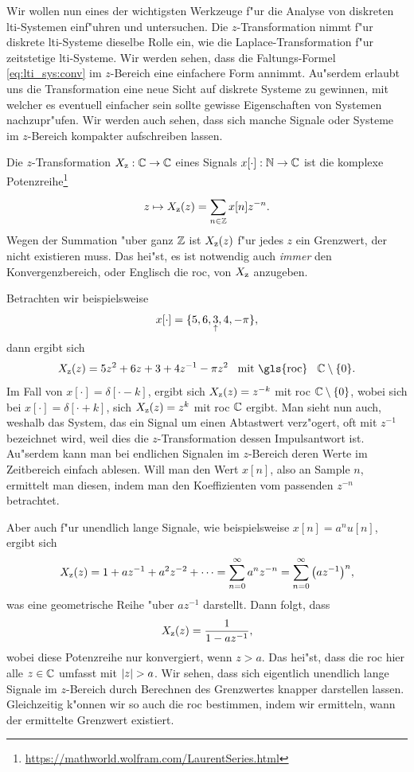 Wir wollen nun eines der wichtigsten Werkzeuge f"ur die Analyse von diskreten \gls{lti}-Systemen einf"uhren und untersuchen.
Die $z$-Transformation nimmt f"ur diskrete \gls{lti}-Systeme dieselbe Rolle ein, wie die Laplace-Transformation f"ur zeitstetige \gls{lti}-Systeme.
Wir werden sehen, dass die Faltungs-Formel \eqref{eq:lti_sys:conv} im $z$-Bereich eine einfachere Form annimmt.
Au"serdem erlaubt uns die Transformation eine neue Sicht auf diskrete Systeme zu gewinnen, mit welcher es eventuell einfacher sein sollte gewisse Eigenschaften von Systemen nachzupr"ufen.
Wir werden auch sehen, dass sich manche Signale oder Systeme im $z$-Bereich kompakter aufschreiben lassen.

Die $z$-Transformation $X_{\rm z}: \mathbb{C} \rightarrow \mathbb{C}$ eines Signals $x[\cdot] : \mathbb{N} \rightarrow \mathbb{C}$ ist die komplexe Potenzreihe\footnote{\url{https://mathworld.wolfram.com/LaurentSeries.html}}
\begin{equation}\label{eq:ztrafo:def}
    z \mapsto X_{\rm z}(z) = {\sum\limits_{n\in\mathbb{Z}}^{}{x[n] z^{-n}}}.
\end{equation}
Wegen der Summation "uber ganz $\mathbb{Z}$ ist $X_{\rm z}(z)$ f"ur jedes $z$ ein Grenzwert, der nicht existieren muss.
Das hei"st, es ist notwendig auch \emph{immer} den Konvergenzbereich, oder Englisch die \gls{roc}, von $X_{\rm z}$ anzugeben.

Betrachten wir beispielsweise \[x[\cdot] = \{5,6,\underset{\uparrow}{3},4,-\pi\},\] dann ergibt sich \[X_\z(z) = 5 z^2 + 6 z + 3 + 4z^{-1} - \pi z^2 \Text{mit \gls{roc}} \C \setminus \{0\}.\] 
Im Fall von $x[\cdot] = \delta[\cdot-k]$, ergibt sich $X_{\rm z}(z) = z^{-k}$ mit \gls{roc} $\mathbb{C} \setminus \{0\}$, wobei sich bei $x[\cdot] = \delta[\cdot+k]$, sich $X_{\rm z}(z) = z^{k}$ mit \gls{roc} $\mathbb{C}$ ergibt.
Man sieht nun auch, weshalb das System, das ein Signal um einen Abtastwert verz"ogert, oft mit $z^{-1}$ bezeichnet wird, weil dies die $z$-Transformation dessen Impulsantwort ist.
Au"serdem kann man bei endlichen Signalen im $z$-Bereich deren Werte im Zeitbereich einfach ablesen. 
Will man den Wert $x[n]$, also an Sample $n$, ermittelt man diesen, indem man den Koeffizienten vom passenden $z^{-n}$ betrachtet. 

Aber auch f"ur unendlich lange Signale, wie beispielsweise $x[n] = a^n u[n]$, ergibt sich
\[
X_{\rm z}(z) 
    = 1 + a z^{-1} + a^2 z^{-2} + \dots
    = {\sum\limits_{n = 0}^{\infty}{
        a^n z^{-n}
    }}
    = {\sum\limits_{n = 0}^{\infty}{
        \left(a z^{-1}\right)^n
    }},
\]
was eine geometrische Reihe "uber $az^{-1}$ darstellt. 
Dann folgt, dass
\[
    X_{\rm z}(z) = \frac{1}{1 - a z^{-1}},
\]
wobei diese Potenzreihe nur konvergiert, wenn $z > a$.
Das hei"st, dass die \gls{roc} hier alle $z \in \mathbb{C}$ umfasst mit ${\left| z \right|} > a$.
Wir sehen, dass sich eigentlich unendlich lange Signale im $z$-Bereich durch Berechnen des Grenzwertes knapper darstellen lassen.
Gleichzeitig k"onnen wir so auch die \gls{roc} bestimmen, indem wir ermitteln, wann der ermittelte Grenzwert existiert.

